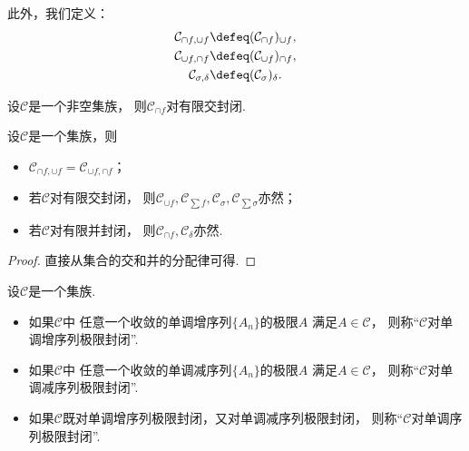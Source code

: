 此外，我们定义：\begin{gather*}
	\mathcal{C}_{\cap f,\cup f}
	\defeq
	(\mathcal{C}_{\cap f})_{\cup f}, \\
	\mathcal{C}_{\cup f,\cap f}
	\defeq
	(\mathcal{C}_{\cup f})_{\cap f}, \\
	\mathcal{C}_{\sigma,\delta}
	\defeq
	(\mathcal{C}_\sigma)_\delta.
\end{gather*}

\begin{proposition}
设\(\mathcal{C}\)是一个非空集族，
则\(\mathcal{C}_{\cap f}\)对有限交封闭.
\end{proposition}

\begin{proposition}
设\(\mathcal{C}\)是一个集族，则\begin{itemize}
	\item \(\mathcal{C}_{\cap f,\cup f} = \mathcal{C}_{\cup f,\cap f}\)；
	\item 若\(\mathcal{C}\)对有限交封闭，
	则\(\mathcal{C}_{\cup f},
	\mathcal{C}_{\sum f},
	\mathcal{C}_\sigma,
	\mathcal{C}_{\sum \sigma}\)亦然；
	\item 若\(\mathcal{C}\)对有限并封闭，
	则\(\mathcal{C}_{\cap f},
	\mathcal{C}_\delta\)亦然.
\end{itemize}
\begin{proof}
直接从集合的交和并的分配律可得.
\end{proof}
\end{proposition}

\begin{definition}
设\(\mathcal{C}\)是一个集族.
\begin{itemize}
	\item 如果\(\mathcal{C}\)中
	任意一个收敛的单调增序列\(\{A_n\}\)的极限\(A\)
	满足\(A\in\mathcal{C}\)，
	则称“\(\mathcal{C}\)对单调增序列极限封闭”.
	\item 如果\(\mathcal{C}\)中
	任意一个收敛的单调减序列\(\{A_n\}\)的极限\(A\)
	满足\(A\in\mathcal{C}\)，
	则称“\(\mathcal{C}\)对单调减序列极限封闭”.
	\item 如果\(\mathcal{C}\)既对单调增序列极限封闭，又对单调减序列极限封闭，
	则称“\(\mathcal{C}\)对单调序列极限封闭”.
\end{itemize}
\end{definition}

